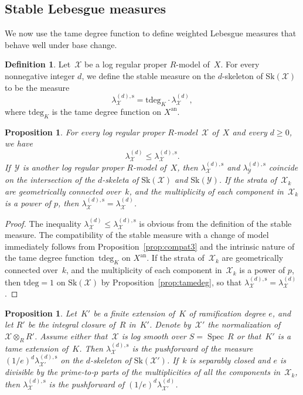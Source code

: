 \documentclass[JEP,XML,SOM,Unicode,NoFloatCountersInSection]{cedram}
\newtheorem{prop}[equation]{Proposition}
\theoremstyle{definition}
\newtheorem{definition}[equation]{Definition}
\numberwithin{equation}{subsection}
\newcommand{\cX}{\ensuremath{\mathscr{X}}}
\newcommand{\cY}{\ensuremath{\mathscr{Y}}}
\newcommand{\an}{\mathrm{an}}
\newcommand{\Sk}{\mathrm{Sk}}
\newcommand{\rs}{\mathrm{s}}
\newcommand{\tdeg}{\mathrm{tdeg}}
\DeclareMathOperator{\Spec}{Spec}
\let\Leb\lambda
\begin{document}
\subsection{Stable Lebesgue measures}
We now use the tame degree function to define weighted Lebesgue measures that behave well under base change.
\begin{definition}\label{def:stablemeas}
Let~$\cX$ be a log regular proper $R$\nobreakdash-model of~$X$. For every nonnegative integer $d$, we define the
stable measure on the $d$\nobreakdash-skeleton of $\Sk(\cX)$ to be the measure
\[
\Leb_{\cX}^{(d),\rs}=\tdeg_K \cdot \Leb_{\cX}^{(d)},
\]
where $\tdeg_K$ is the tame degree function on $X^{\an}$.
\end{definition}
\begin{prop}\label{prop:stmeasure1}
For every log regular proper $R$\nobreakdash-model~$\cX$ of~$X$ and every $d\geq 0$, we have
\[
\Leb_{\cX}^{(d)} \leq \Leb_{\cX}^{(d),\rs}.
\]
If~$\cY$ is another log regular proper $R$\nobreakdash-model of~$X$, then $\Leb_{\cX}^{(d),\rs}$ and $\Leb_{\cY}^{(d),\rs}$ coincide on the intersection of the $d$\nobreakdash-skeleta of $\Sk(\cX)$ and $\Sk(\cY)$. If the strata of~$\cX_k$ are geometrically connected over~$k$, and the multiplicity of each component in~$\cX_k$ is a power of $p$, then $\Leb_{\cX}^{(d),\rs}=\Leb_{\cX}^{(d)}$.
\end{prop}
\begin{proof}
The inequality $\Leb_{\cX}^{(d)} \leq \Leb_{\cX}^{(d),\rs}$ is obvious from the definition of the stable measure.
The compatibility of the stable measure with a change of model immediately follows from Proposition~\ref{prop:compat3} and the intrinsic nature of the tame degree function~$\tdeg_K$ on $X^{\an}$. If the strata of~$\cX_k$ are geometrically connected over~$k$, and the multiplicity of each component in~$\cX_k$ is a power of $p$, then $\tdeg=1$ on $\Sk(\cX)$ by Proposition~\ref{prop:tamedeg}, so that $\Leb_{\cX}^{(d),\rs}=\Leb_{\cX}^{(d)}$.
\end{proof}
\begin{prop}\label{prop:stmeasure2}
Let~$K'$ be a finite extension of~$K$ of ramification degree $e$, and let $R'$ be the integral closure of~$R$ in~$K'$. Denote by~$\cX'$ the normalization of $\cX\otimes_R R'$.
Assume either that~$\cX$ is log smooth over $S=\Spec\,R$ or that~$K'$ is a tame extension of~$K$. Then $\Leb^{(d),\rs}_{\cX}$ is the pushforward of the measure $(1/e)^d\Leb^{(d),\rs}_{\cX'}$ on the $d$\nobreakdash-skeleton of $\Sk(\cX')$. If~$k$ is separably closed and $e$ is divisible by the prime-to-$p$ parts of the multiplicities of all the components in~$\cX_k$, then $\Leb^{(d),\rs}_{\cX}$ is the pushforward of $(1/e)^d\Leb^{(d)}_{\cX'}$.
\end{prop}
\end{document}
